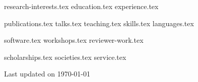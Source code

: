\documentclass[letterpaper,13pt]{article}
\newcommand{\updateinfo}[1][\today]{\par\vfill\hfill{\normalsize\color{MidnightBlue}Last updated on #1}}
\begin{document}


{research-interests.tex}
{education.tex}
{experience.tex}

\pagebreak

{publications.tex}
{talks.tex}
{teaching.tex}
\sidebyside
    {{skills.tex}}
    {{languages.tex}}

\pagebreak

{software.tex}
{workshops.tex}
{reviewer-work.tex}

\pagebreak

{scholarships.tex}
{societies.tex}
{service.tex}

\updateinfo
\end{document}
